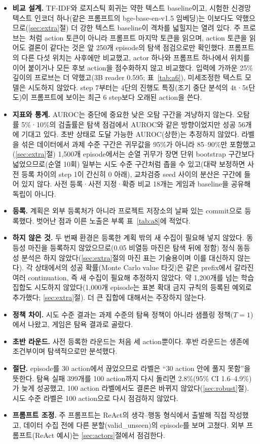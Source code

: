 \documentclass[11pt]{article}
\begin{document}
\begin{itemize}
\item \textbf{비교 설계.} TF-IDF와 로지스틱 회귀는 약한 텍스트 baseline이고, 시험한 신경망 텍스트 인코더 하나(같은 프롬프트의 bge-base-en-v1.5 임베딩)는 이보다도 약했으므로(\ref{sec:extra}절) 더 강한 텍스트 baseline이 격차를 넓힐지는 열려 있다. 주 프로브는~\cite{ruan2026doomed}처럼 action 토큰이 아니라 프롬프트 마지막 토큰을 읽으며, action 토큰을 읽어도 결론이 같다는 것은 앞 250개 episode의 탐색 점검으로만 확인했다. 프롬프트의 다른 다섯 위치는 사후에만 비교했고, actor 하나와 프롬프트 하나에서 위치를 이어 붙이거나 모든 후보 action을 점수화하지 않고 비교했다. 입력에 가까운 25\% 깊이의 프로브는 더 약했고(3B reader 0.595; 표~\ref{tab:a6}), 미세조정한 텍스트 모델은 시도하지 않았다. step 7부터는 4단의 진행도 특징(조기 중단 분석의 4t·5t단도)이 프롬프트에 보이는 최근 6 step보다 오래된 action을 쓴다.
\item \textbf{지표와 통계.} AUROC는 중단에 중요한 낮은 오탐 구간을 겨냥하지 않는다. 오탐률 5\%·10\%의 검출률은 탐색 점검에서 AUROC와 같은 방향이었지만 성공 56개에 기대고 있다. 초반 상태로 도달 가능한 AUROC(상한)는 추정하지 않았다. 라벨을 섞은 데이터에서 과제 수준 구간은 귀무값을 95\%가 아니라 85--90\%만 포함했고(\ref{sec:extra}절) 1,500개 episode에서는 순열 귀무가 장면 단위 bootstrap 구간보다 넓었으므로(순열 10회) 일부는 시도 수준 구간처럼 좁을 수 있고(대략 보정하면 사전 등록 차이의 step 1이 간신히 0 아래), 교차검증 seed 사이의 분산은 구간에 들어 있지 않다. 사전 등록·사전 지정·확증 비교 18개는 게임과 baseline을 공유해 독립이 아니다.
\item \textbf{등록.} 계획은 외부 등록처가 아니라 프로젝트 저장소의 날짜 있는 commit으로 등록했다. 벗어난 점과 이른 노출은 부록 표~\ref{tab:a8}에 적었다.
\item \textbf{하지 않은 것.} 두 번째 환경은 등록한 계획 밖의 새 수집이 필요해 넣지 않았다. 동등성 마진을 등록하지 않았으므로(0.05 비열등 마진은 탐색 뒤에 정함) 정식 동등성 분석은 하지 않았다(\ref{sec:extra}절의 마진 표는 기술용이며 이를 대신하지 않는다). 각 상태에서의 성공 확률(Monte Carlo value 타깃)은 같은 prefix에서 갈라진 여러 continuation, 즉 새 수집이 필요해 추정하지 않았다. 약 1,200개를 넘는 학습 집합도 시도하지 않았다(1,000개 episode는 표본 확대 금지 규칙의 등록된 예외로 추가했다; \ref{sec:extra}절). 더 큰 집합에 대해서는 주장하지 않는다.
\item \textbf{정책 차이.} 시도 수준 결과는 과제 수준의 탐욕 정책이 아니라 샘플링 정책($T = 1$)에서 나왔고, 게임은 탐욕 결과로 골랐다.
\item \textbf{초반 라운드.} 사전 등록한 라운드는 처음 세 action뿐이다. 후반 라운드는 생존에 조건부이며 탐색적으로만 분석했다.
\item \textbf{절단.} episode를 30 action에서 끊었으므로 라벨은 ``30 action 안에 풀지 못함''을 뜻한다. 탐욕 실패 399개를 100 action까지 다시 돌리면 2.8\%(95\% CI 1.6--4.9\%)가 늦게 성공했고, 100 action 라벨에서도 결론은 바뀌지 않았다(\ref{sec:robust}절). 시도 수준 라벨은 100 action으로 다시 점검하지 않았다.
\item \textbf{프롬프트 조정.} 주 프롬프트는 ReAct의 생각--행동 형식에서 출발해 직접 작성했고, 데이터 수집 전에 다른 분할(valid\_unseen)의 episode를 보며 고쳤다. 외부 프롬프트(ReAct 예시)는 \ref{sec:actors}절에서 점검한다.
\end{itemize}
\end{document}

